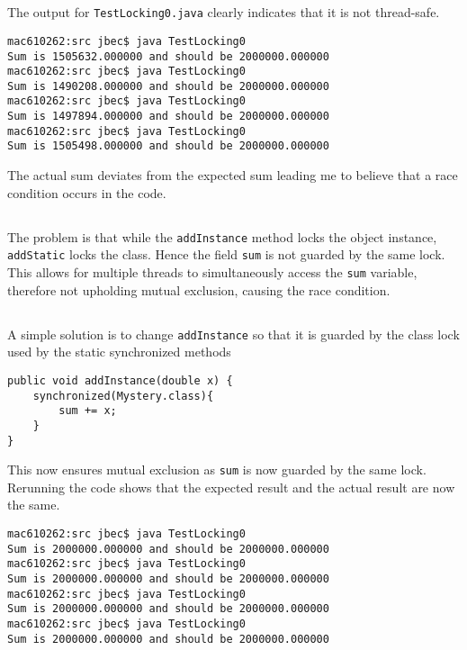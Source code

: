 \documentclass{ituhandin}
\begin{document}
\maketitlepage
\signpage

\chapter{} %

\section{}
The output for \texttt{TestLocking0.java} clearly indicates that it is not thread-safe.
\begin{lstlisting}[language={}, frame={}]
mac610262:src jbec$ java TestLocking0
Sum is 1505632.000000 and should be 2000000.000000
mac610262:src jbec$ java TestLocking0
Sum is 1490208.000000 and should be 2000000.000000
mac610262:src jbec$ java TestLocking0
Sum is 1497894.000000 and should be 2000000.000000
mac610262:src jbec$ java TestLocking0
Sum is 1505498.000000 and should be 2000000.000000
\end{lstlisting}

The actual sum deviates from the expected sum leading me to believe that a race condition occurs in the code.

\section{}
The problem is that while the \texttt{addInstance} method locks the object instance, \texttt{addStatic} locks the class. Hence the field \texttt{sum} is not guarded by the same lock. This allows for multiple threads to simultaneously access the \texttt{sum} variable, therefore not upholding mutual exclusion, causing the race condition.

\section{}
A simple solution is to change \texttt{addInstance} so that it is guarded by the class lock used by the static synchronized methods
\begin{lstlisting}[frame={}]
public void addInstance(double x) {
    synchronized(Mystery.class){
        sum += x;
    }
}
\end{lstlisting}
This now ensures mutual exclusion as \texttt{sum} is now guarded by the same lock. Rerunning the code shows that the expected result and the actual result are now the same.

\begin{lstlisting}[language={}, frame={}]
mac610262:src jbec$ java TestLocking0
Sum is 2000000.000000 and should be 2000000.000000
mac610262:src jbec$ java TestLocking0
Sum is 2000000.000000 and should be 2000000.000000
mac610262:src jbec$ java TestLocking0
Sum is 2000000.000000 and should be 2000000.000000
mac610262:src jbec$ java TestLocking0
Sum is 2000000.000000 and should be 2000000.000000
\end{lstlisting}
\end{document}

